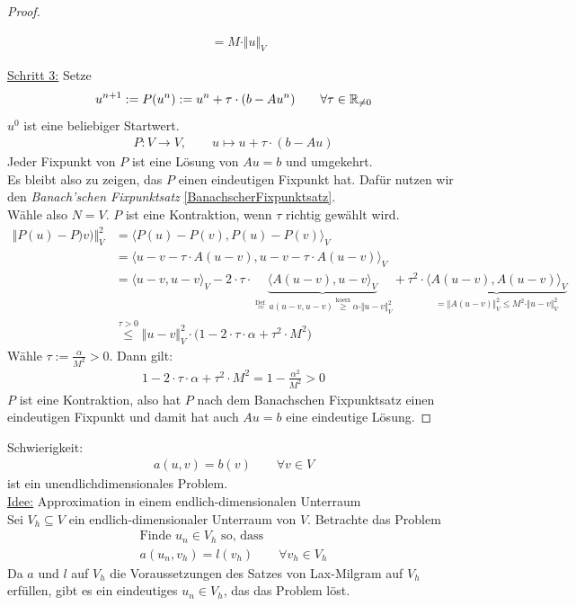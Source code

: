 \begin{proof}
\begin{enumerate}[label=(\alph*)]
\begin{align*}
&=M\cdot\Vert u\Vert_V
\end{align*}
\end{enumerate}
\underline{Schritt 3:} Setze
\begin{align*}
u^{n+1}:=P(u^n):=u^n+\tau\cdot(b-A u^n)\qquad\forall\tau\in\mathbb{R}_{\neq0}
\end{align*}
$u^0$ ist eine beliebiger Startwert.
\begin{align*}
P:V\to V,\qquad u\mapsto u+\tau\cdot(b-Au)
\end{align*}
Jeder Fixpunkt von $P$ ist eine Lösung von $Au=b$ und umgekehrt.\\
Es bleibt also zu zeigen, das $P$ einen eindeutigen Fixpunkt hat. Dafür nutzen wir den \textit{Banach'schen Fixpunktsatz} \ref{BanachscherFixpunktsatz}.\\

Wähle also $N=V$. $P$ ist eine Kontraktion, wenn $\tau$ richtig gewählt wird.
\begin{align*}
\Vert P(u)-P)v)\Vert^2_V
&=\big\langle P(u)-P(v),P(u)-P(v)\big\rangle_V\\
&=\big\langle u-v-\tau\cdot A(u-v),u-v-\tau\cdot A(u-v)\big\rangle_V\\
&=\langle u-v,u-v\rangle_V-2\cdot\tau\cdot\underbrace{\big\langle A(u-v),u-v\big\rangle_V}_{\stackrel{\text{Def.}}{=}a(u-v,u-v)\stackrel{\text{koerz}}{\geq}\alpha\cdot\Vert u-v\Vert^2_V}+\tau^2\cdot\underbrace{\big\langle A(u-v),A(u-v)\big\rangle_V}_{=\Vert A(u-v)\Vert^2_V\leq M^2\cdot\Vert u-v\Vert^2_V}\\
&\stackrel{\tau>0}{\leq}
\Vert u-v\Vert^2_V\cdot\big(1-2\cdot\tau\cdot\alpha+\tau^2\cdot M^2\big)
\end{align*}
Wähle $\tau:=\frac{\alpha}{M^2}>0$. Dann gilt:
\begin{align*}
1-2\cdot\tau\cdot\alpha+\tau^2\cdot M^2=1-\frac{\alpha^2}{M^2}>0
\end{align*}
$P$ ist eine Kontraktion, also hat $P$ nach dem Banachschen Fixpunktsatz einen eindeutigen Fixpunkt und damit hat auch $Au=b$ eine eindeutige Lösung.
\end{proof}

Schwierigkeit:
\begin{align*}
a(u,v)=b(v)\qquad\forall v\in V
\end{align*}
ist ein unendlichdimensionales Problem.\\
\underline{Idee:} Approximation in einem endlich-dimensionalen Unterraum\\
Sei $V_h\subseteq V$ ein endlich-dimensionaler Unterraum von $V$. Betrachte das Problem
\begin{align*}
\text{Finde }u_n\in V_h \text{ so, dass }\qquad \\
a(u_n,v_h)=l(v_h)\qquad\forall v_h\in V_h
\end{align*}
Da $a$ und $l$ auf $V_h$ die Voraussetzungen des Satzes von Lax-Milgram auf $V_h$ erfüllen, gibt es ein eindeutiges $u_n\in V_h$, das das Problem löst.\\

